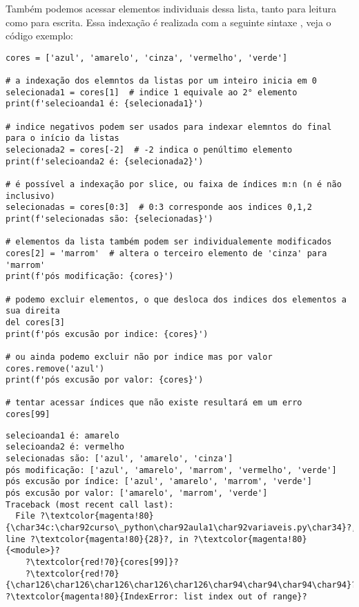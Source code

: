 Também podemos acessar elementos individuais dessa lista, tanto para leitura como para escrita.
Essa indexação é realizada com a seguinte sintaxe , veja o código exemplo:
\begin{verbatim}
cores = ['azul', 'amarelo', 'cinza', 'vermelho', 'verde']

# a indexação dos elemntos da listas por um inteiro inicia em 0
selecionada1 = cores[1]  # indice 1 equivale ao 2° elemento
print(f'selecioanda1 é: {selecionada1}')

# indice negativos podem ser usados para indexar elemntos do final para o início da listas
selecionada2 = cores[-2]  # -2 indica o penúltimo elemento
print(f'selecioanda2 é: {selecionada2}')

# é possível a indexação por slice, ou faixa de índices m:n (n é não inclusivo)
selecionadas = cores[0:3]  # 0:3 corresponde aos indices 0,1,2
print(f'selecionadas são: {selecionadas}')

# elementos da lista também podem ser individualemente modificados
cores[2] = 'marrom'  # altera o terceiro elemento de 'cinza' para 'marrom'
print(f'pós modificação: {cores}')

# podemo excluir elementos, o que desloca dos indices dos elementos a sua direita
del cores[3]
print(f'pós excusão por indice: {cores}')

# ou ainda podemo excluir não por indice mas por valor
cores.remove('azul')
print(f'pós excusão por valor: {cores}')

# tentar acessar índices que não existe resultará em um erro
cores[99]
\end{verbatim}
\begin{verbatim}
selecioanda1 é: amarelo
selecioanda2 é: vermelho
selecionadas são: ['azul', 'amarelo', 'cinza']
pós modificação: ['azul', 'amarelo', 'marrom', 'vermelho', 'verde']
pós excusão por índice: ['azul', 'amarelo', 'marrom', 'verde']
pós excusão por valor: ['amarelo', 'marrom', 'verde']
Traceback (most recent call last):
  File ?\textcolor{magenta!80}{\char34c:\char92curso\_python\char92aula1\char92variaveis.py\char34}?, line ?\textcolor{magenta!80}{28}?, in ?\textcolor{magenta!80}{<module>}?
    ?\textcolor{red!70}{cores[99]}?
    ?\textcolor{red!70}{\char126\char126\char126\char126\char126\char94\char94\char94\char94}?
?\textcolor{magenta!80}{IndexError: list index out of range}?
\end{verbatim}

